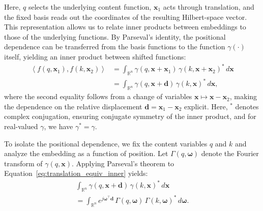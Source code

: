\documentclass{article}
\theoremstyle{plain}
\theoremstyle{definition}
\theoremstyle{remark}
\begin{document}
Here, $q$ selects the underlying content function, $\mathbf{x}_1$ acts through translation, and the fixed basis reads out the coordinates of the resulting Hilbert-space vector. This representation allows us to relate inner products between embeddings to those of the underlying functions. By Parseval’s identity, the positional dependence can be transferred from the basis functions to the function $\gamma(\cdot)$ itself, yielding an inner product between shifted functions:
\begin{equation}
\begin{aligned}
\left\langle f(q, \mathbf{x}_1), f(k, \mathbf{x}_2) \right\rangle
&= \int_{\mathbb{R}^n} \gamma(q, \mathbf{x} + \mathbf{x}_1)\,
   \gamma(k, \mathbf{x} + \mathbf{x}_2)^* \, d\mathbf{x} \\
&= \int_{\mathbb{R}^n} \gamma(q, \mathbf{x} + \mathbf{d})\,
   \gamma(k, \mathbf{x})^* \, d\mathbf{x},
\end{aligned}
\label{eq:translation_equiv_inner}
\end{equation}
where the second equality follows from a change of variables $\mathbf{x} \mapsto \mathbf{x} - \mathbf{x}_2$, making the dependence on the relative displacement $\mathbf{d} = \mathbf{x}_1 - \mathbf{x}_2$ explicit. Here, \(^*\) denotes complex conjugation, ensuring conjugate symmetry of the inner product, and for real-valued \( \gamma \), we have \( \gamma^* = \gamma \).

To isolate the positional dependence, we fix the content variables $q$ and $k$ and analyze the embedding as a function of position. Let $\Gamma(q,\boldsymbol{\omega})$ denote the Fourier transform of $\gamma(q,\mathbf{x})$. Applying Parseval’s theorem to Equation~\eqref{eq:translation_equiv_inner} yields:
\begin{multline}
\label{eq:parseval_shift}
\int_{\mathbb{R}^n}
\gamma(q, \mathbf{x} + \mathbf{d})\,
\gamma(k, \mathbf{x})^* \, d\mathbf{x} \\
= \int_{\mathbb{R}^n}
e^{j \boldsymbol{\omega}^\top \mathbf{d}}\,
\Gamma(q, \boldsymbol{\omega})\,
\Gamma(k, \boldsymbol{\omega})^*
\, d\boldsymbol{\omega}. 
\end{multline}
\end{document}
